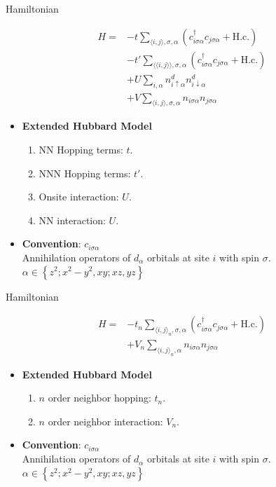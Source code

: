 \documentclass{beamer}
\begin{document}
	
\begin{frame}{Hamiltonian}
	\begin{multicols}{2}
	\begin{align*}
		H =& -t\sum_{\langle i,j \rangle ,\sigma,\alpha}\left(c^\dagger_{i\sigma\alpha}c_{j\sigma\alpha} + \text{H.c.}\right) 
		\\ &- t'\sum_{\langle\langle i,j\rangle\rangle,\sigma,\alpha}\left(c^\dagger_{i\sigma\alpha}c_{j\sigma\alpha} + \text{H.c.}\right)
		\\ &+U\sum_{i,\alpha}n^d_{i\uparrow\alpha}n^d_{i\downarrow\alpha} 
		\\ &+ V\sum_{\langle i,j \rangle,\sigma,\alpha}n_{i\sigma\alpha}n_{j\sigma\alpha}
	\end{align*}
	\newpage
	\begin{itemize}
		\item \textbf{Extended Hubbard Model}
		\begin{enumerate}
			\item NN Hopping terms: $t$.
			\item NNN Hopping terms: $t'$.
			\item Onsite interaction: $U$.
			\item NN interaction: $U$.
		\end{enumerate}
		\item \textbf{Convention}: $c_{i\sigma\alpha}$ \\
		Annihilation operators of $d_\alpha$ orbitals at site $i$ with spin $\sigma$.\\
		$\alpha \in \left \{ z^2;x^2-y^2,xy;xz,yz \right \}$
	\end{itemize}
	\end{multicols}
\end{frame}

\begin{frame}{Hamiltonian}
	\begin{multicols}{2}
	\begin{align*}
		H =& -t_n\sum_{\langle i,j \rangle_n,\sigma,\alpha}\left(c^\dagger_{i\sigma\alpha}c_{j\sigma\alpha} + \text{H.c.}\right) 
		\\ &+V_n\sum_{\langle i,j \rangle_n,\alpha}n_{i\sigma\alpha}n_{j\sigma\alpha}
	\end{align*}
	\newpage
	\begin{itemize}
		\item \textbf{Extended Hubbard Model}
		\begin{enumerate}
			\item $n$ order neighbor hopping: $t_n$.
			\item $n$ order neighbor interaction: $V_n$.
		\end{enumerate}
		\item \textbf{Convention}: $c_{i\sigma\alpha}$ \\
		Annihilation operators of $d_\alpha$ orbitals at site $i$ with spin $\sigma$.\\
		$\alpha \in \left \{ z^2;x^2-y^2,xy;xz,yz \right \}$
	\end{itemize}
	\end{multicols}
\end{frame}
	
\end{document}
